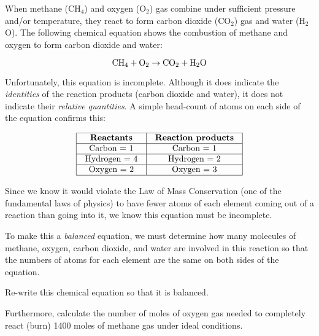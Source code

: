 

When methane (CH$_{4}$) and oxygen (O$_{2}$) gas combine under sufficient pressure and/or temperature, they react to form carbon dioxide (CO$_{2}$) gas and water (H$_{2}$O).  The following chemical equation shows the combustion of methane and oxygen to form carbon dioxide and water:

$$\hbox{CH}_4 + \hbox{O}_2 \to \hbox{CO}_2 + \hbox{H}_2\hbox{O}$$

Unfortunately, this equation is incomplete.  Although it does indicate the {\it identities} of the reaction products (carbon dioxide and water), it does not indicate their {\it relative quantities}.  A simple head-count of atoms on each side of the equation confirms this: 


$$\vbox{\offinterlineskip
\halign{\strut
\vrule \quad\hfil # \ \hfil & 
\vrule \quad\hfil # \ \hfil \vrule \cr
\noalign{\hrule}
%
{\bf Reactants} & {\bf Reaction products} \cr
%
\noalign{\hrule}
%
Carbon = 1 & Carbon = 1 \cr
%
\noalign{\hrule}
%
Hydrogen = 4 & Hydrogen = 2 \cr
%
\noalign{\hrule}
%
Oxygen = 2 & Oxygen = 3 \cr
%
\noalign{\hrule}
} %
}$$ %

Since we know it would violate the Law of Mass Conservation (one of the fundamental laws of physics) to have fewer atoms of each element coming out of a reaction than going into it, we know this equation must be incomplete.

To make this a {\it balanced} equation, we must determine how many molecules of methane, oxygen, carbon dioxide, and water are involved in this reaction so that the numbers of atoms for each element are the same on both sides of the equation.  

\vskip 10pt

Re-write this chemical equation so that it is balanced.

\vskip 10pt

Furthermore, calculate the number of moles of oxygen gas needed to completely react (burn) 1400 moles of methane gas under ideal conditions.






